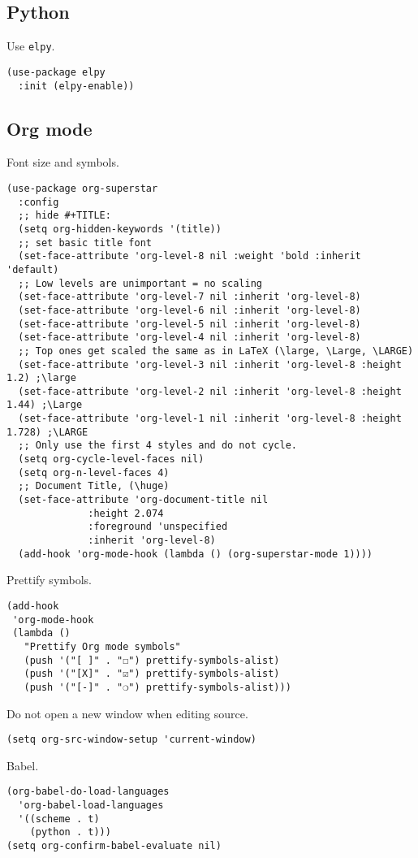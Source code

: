 \documentclass[a4paper,11pt]{article}
\begin{document}
\subsection{Python}
\label{sec:org986b857}
Use \texttt{elpy}.
\begin{verbatim}
(use-package elpy
  :init (elpy-enable))
\end{verbatim}

\subsection{Org mode}
\label{sec:org0b669f6}
Font size and symbols.
\begin{verbatim}
(use-package org-superstar
  :config
  ;; hide #+TITLE:
  (setq org-hidden-keywords '(title))
  ;; set basic title font
  (set-face-attribute 'org-level-8 nil :weight 'bold :inherit 'default)
  ;; Low levels are unimportant = no scaling
  (set-face-attribute 'org-level-7 nil :inherit 'org-level-8)
  (set-face-attribute 'org-level-6 nil :inherit 'org-level-8)
  (set-face-attribute 'org-level-5 nil :inherit 'org-level-8)
  (set-face-attribute 'org-level-4 nil :inherit 'org-level-8)
  ;; Top ones get scaled the same as in LaTeX (\large, \Large, \LARGE)
  (set-face-attribute 'org-level-3 nil :inherit 'org-level-8 :height 1.2) ;\large
  (set-face-attribute 'org-level-2 nil :inherit 'org-level-8 :height 1.44) ;\Large
  (set-face-attribute 'org-level-1 nil :inherit 'org-level-8 :height 1.728) ;\LARGE
  ;; Only use the first 4 styles and do not cycle.
  (setq org-cycle-level-faces nil)
  (setq org-n-level-faces 4)
  ;; Document Title, (\huge)
  (set-face-attribute 'org-document-title nil
		      :height 2.074
		      :foreground 'unspecified
		      :inherit 'org-level-8)
  (add-hook 'org-mode-hook (lambda () (org-superstar-mode 1))))
\end{verbatim}

Prettify symbols.
\begin{verbatim}
(add-hook
 'org-mode-hook
 (lambda ()
   "Prettify Org mode symbols"
   (push '("[ ]" . "☐") prettify-symbols-alist)
   (push '("[X]" . "☑") prettify-symbols-alist)
   (push '("[-]" . "❍") prettify-symbols-alist)))
\end{verbatim}

Do not open a new window when editing source.
\begin{verbatim}
(setq org-src-window-setup 'current-window)
\end{verbatim}

Babel.
\begin{verbatim}
(org-babel-do-load-languages
  'org-babel-load-languages
  '((scheme . t)
    (python . t)))
(setq org-confirm-babel-evaluate nil)
\end{verbatim}
\end{document}
